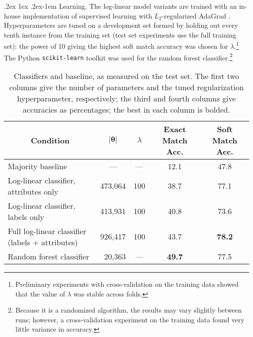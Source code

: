\documentclass[11pt,letterpaper]{article}
\makeatletter
\renewcommand{\paragraph}{%
  \@startsection{paragraph}{4}%
  {\z@}{.2ex \@plus 1ex \@minus .2ex}{-1em}%
  {\normalfont\normalsize\bfseries}%
}
\makeatother
\begin{document}
\paragraph{Learning.} The log-linear model variants are trained with an in-house implementation of supervised learning with $L_2$-regularized AdaGrad \citep{adagrad}.
Hyperparameters are tuned  
on a development set formed by holding out every tenth instance from the training set 
(test set experiments use the full training set):
the power of 10 giving the highest soft match accuracy was chosen for $\lambda$.\footnote{Preliminary experiments with cross-validation on the training data showed that the value of $\lambda$ was stable across folds.}
The Python {\tt scikit-learn} toolkit \citep{scikit-learn} was used for the random forest classifier.\footnote{Because it is a randomized algorithm, the results may vary slightly between runs; 
however, a cross-validation experiment on the training data found very little variance in accuracy.}




\begin{table*}\small\centering
\begin{tabular}{lrrcc}
\multicolumn{1}{c}{\bf Condition} & \multicolumn{1}{c}{$|\boldsymbol{\theta}|$} %
& \multicolumn{1}{c}{$\lambda$} 
& \multicolumn{1}{c}{\bf Exact Match Acc.} & \multicolumn{1}{c}{\bf Soft Match Acc.} 
\\
\midrule
Majority baseline & \multicolumn{1}{c}{---} & \multicolumn{1}{c}{---} %
& 12.1 & 47.8
\\
Log-linear classifier, attributes only & 473,064 & 100 & 38.7 & 77.1 \\
Log-linear classifier, labels only & 413,931 & 100 & 40.8 & 73.6  \\
Full log-linear classifier (labels + attributes) & 926,417 & 100 & 43.7 & \bf 78.2 \\
Random forest classifier & 20,363 & \multicolumn{1}{c}{---} & \bf 49.7 & 77.5 \\

\end{tabular}
\caption{Classifiers and baseline, as measured on the test set.
The first two columns give the number of parameters and the tuned regularization hyperparameter, respectively; 
the third and fourth columns give accuracies as percentages; the best in each column is bolded.}
\label{tbl:results}
\end{table*}
\end{document}

